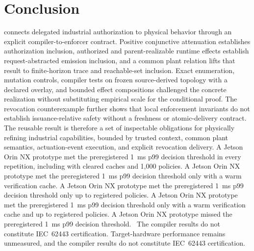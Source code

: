\section{Conclusion}
\label{sec:conclusion}

\zonecap{} connects delegated industrial authorization to physical behavior through an explicit compiler-to-enforcer contract. Positive conjunctive attenuation establishes authorization inclusion, authorized and parent-realizable runtime effects establish request-abstracted emission inclusion, and a common plant relation lifts that result to finite-horizon trace and reachable-set inclusion. Exact enumeration, mutation controls, compiler tests on frozen source-derived topology with a declared overlay, and bounded effect compositions challenged the concrete realization without substituting empirical scale for the conditional proof. The revocation counterexample further shows that local enforcement invariants do not establish issuance-relative safety without a freshness or atomic-delivery contract. The reusable result is therefore a set of inspectable obligations for physically refining industrial capabilities, bounded by trusted context, common plant semantics, actuation-event execution, and explicit revocation delivery. \ifzonecaphardware\ifcase\cfiveoutcomecase
A Jetson Orin NX prototype met the preregistered 1~ms p99 decision threshold in every repetition, including with cleared caches and 1,000 policies.
\or
A Jetson Orin NX prototype met the preregistered 1~ms p99 decision threshold only with a warm verification cache.
\or
A Jetson Orin NX prototype met the preregistered 1~ms p99 decision threshold only up to  registered policies.
\or
A Jetson Orin NX prototype met the preregistered 1~ms p99 decision threshold only with a warm verification cache and up to  registered policies.
\or
A Jetson Orin NX prototype missed the preregistered 1~ms p99 decision threshold.
\fi\ The compiler results do not constitute IEC~62443 certification.
\else
Target-hardware performance remains unmeasured, and the compiler results do not constitute IEC~62443 certification.
\fi

